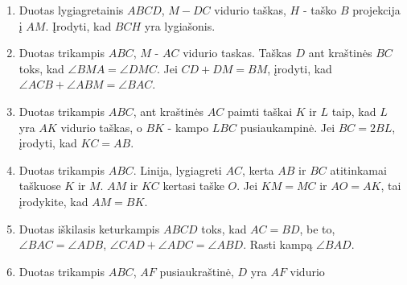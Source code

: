 \begin{enumerate}
  \item Duotas lygiagretainis $ABCD$, $M-DC$ vidurio taškas, $H$ - taško $B$
  projekcija į $AM$. Įrodyti, kad $BCH$ yra lygiašonis.
\item Duotas trikampis $ABC$, $M$ - $AC$ vidurio taskas.  Taškas $D$ ant
  kraštinės $BC$ toks, kad $\angle BMA = \angle DMC$. Jei $CD + DM = BM$,
  įrodyti, kad $\angle ACB +\angle ABM=\angle BAC$.
\item Duotas trikampis $ABC$, ant kraštinės $AC$ paimti taškai $K$ ir $L$
  taip, kad $L$ yra $AK$ vidurio taškas, o $BK$ - kampo $LBC$
  pusiaukampinė. Jei $BC = 2BL$, įrodyti, kad $KC = AB$. 
\item Duotas trikampis $ABC$. Linija, lygiagreti $AC$, kerta $AB$ ir $BC$
  atitinkamai taškuose $K$ ir $M$. $AM$ ir $KC$ kertasi taške $O$. Jei $KM
  = MC$ ir $AO = AK$, tai įrodykite, kad $AM = BK$. 
\item Duotas iškilasis keturkampis $ABCD$ toks, kad $AC = BD$, be to,
  $\angle BAC = \angle ADB$, $\angle CAD + \angle ADC = \angle ABD$. Rasti
  kampą $\angle BAD$.
\item Duotas trikampis $ABC$, $AF$ pusiaukraštinė, $D$ yra $AF$ vidurio

\end{enumerate}
